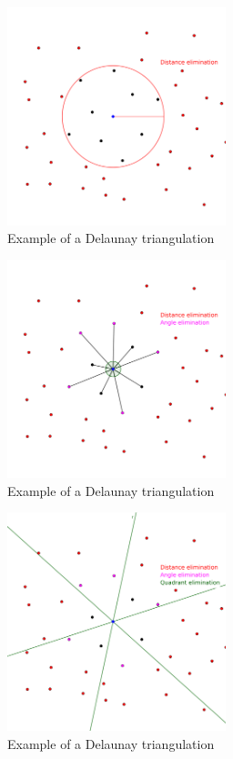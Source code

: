 \documentclass[lettersize,journal,english]{IEEEtran}
\begin{document}
\begin{figure}[!b]
    \centering
    \includegraphics[width=2.5in]{images/illus_crit/distance_elim.png}
    \caption{Example of a Delaunay triangulation}
    \label{crit_dis}
\end{figure}

\begin{figure}[!t]
    \centering
    \includegraphics[width=2.5in]{images/illus_crit/angle_elim.png}
    \caption{Example of a Delaunay triangulation}
    \label{crit_ang}
\end{figure}

\begin{figure}[!b]
    \centering
    \includegraphics[width=2.5in]{images/illus_crit/quadrant_elim.png}
    \caption{Example of a Delaunay triangulation}
    \label{crit_qua}
\end{figure}
\end{document}
